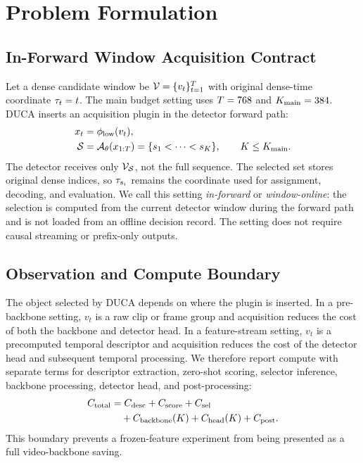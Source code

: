 \section{Problem Formulation}

\subsection{In-Forward Window Acquisition Contract}

Let a dense candidate window be
$\mathcal{V}=\{v_t\}_{t=1}^{T}$ with original dense-time coordinate
$\tau_t=t$. The main budget setting uses $T=768$ and
$K_{\mathrm{main}}=384$. DUCA inserts an acquisition plugin in the detector forward path:
\begin{align}
    x_t &= \phi_{\mathrm{low}}(v_t), \\
    \mathcal{S} &= \mathcal{A}_{\theta}(x_{1:T})
          = \{s_1 < \cdots < s_{K}\}, \qquad
          K \le K_{\mathrm{main}} .
    \label{eq:online_policy}
\end{align}
The detector receives only $\mathcal{V}_{\mathcal{S}}$, not the full sequence. The
selected set stores original dense indices, so $\tau_{s_i}$ remains the
coordinate used for assignment, decoding, and evaluation. We call this setting
\emph{in-forward} or \emph{window-online}: the selection is computed from the
current detector window during the forward path and is not loaded from an
offline decision record. The setting does not require causal streaming or
prefix-only outputs.

\subsection{Observation and Compute Boundary}

The object selected by DUCA depends on where the plugin is inserted. In a
pre-backbone setting, $v_t$ is a raw clip or frame group and acquisition reduces
the cost of both the backbone and detector head. In a feature-stream setting,
$v_t$ is a precomputed temporal descriptor and acquisition reduces the cost of
the detector head and subsequent temporal processing. We therefore report
compute with separate terms for descriptor extraction, zero-shot scoring,
selector inference, backbone processing, detector head, and post-processing:
\begin{align}
    C_{\mathrm{total}}
    &=
    C_{\mathrm{desc}} + C_{\mathrm{score}} + C_{\mathrm{sel}}
    \notag\\
    &\quad
    + C_{\mathrm{backbone}}(K)
    + C_{\mathrm{head}}(K)
    + C_{\mathrm{post}} .
    \label{eq:compute_boundary}
\end{align}
This boundary prevents a frozen-feature experiment from being presented as a
full video-backbone saving.

